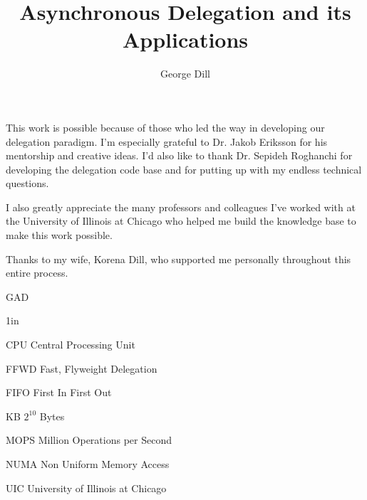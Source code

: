 \documentclass{uicthesi}
\begin{document}

\title{Asynchronous Delegation and its Applications}
\author{George Dill}
\maketitle




 \acknowledgements
{This work is possible because of those who led the way in developing our delegation paradigm. I'm especially grateful to Dr. Jakob Eriksson for his mentorship and creative ideas. I'd also like to thank Dr. Sepideh Roghanchi for developing the delegation code base and for putting up with my endless technical questions. 

I also greatly appreciate the many professors and colleagues I've worked with at the University of Illinois at Chicago who helped me build the knowledge base to make this work possible. 

Thanks to my wife, Korena Dill, who supported me personally throughout this entire process. 
\\ 

\begin{flushright}GAD\end{flushright}}




\tableofcontents
\listoftables
\listoffigures
\listofabbreviations
\begin{list}
{}
{\setlength
  {}{1in}
    \setlength{\leftmargin}{1.5in}
    \setlength{\labelsep}{.5in}
    \setlength{\rightmargin}{\leftmargin}}
\item[CPU\hfill] Central Processing Unit
\item[FFWD\hfill] Fast, Flyweight Delegation
\item[FIFO\hfill] First In First Out
\item[KB\hfill]  $2^{10}$ Bytes
\item[MOPS\hfill] Million Operations per Second
\item[NUMA\hfill] Non Uniform Memory Access
\item[UIC\hfill] University of Illinois at Chicago
\end{list}
 
\end{document}
